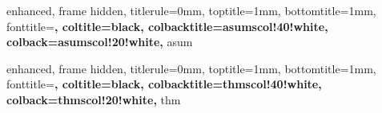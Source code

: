 

{
  enhanced,
  frame hidden,
  titlerule=0mm,
  toptitle=1mm,
  bottomtitle=1mm,
  fonttitle=\bfseries\large,
  coltitle=black,
  colbacktitle=asumscol!40!white,
  colback=asumscol!20!white,
}{asum}




{
  enhanced,
  frame hidden,
  titlerule=0mm,
  toptitle=1mm,
  bottomtitle=1mm,
  fonttitle=\bfseries\large,
  coltitle=black,
  colbacktitle=thmscol!40!white,
  colback=thmscol!20!white,
}{thm}








